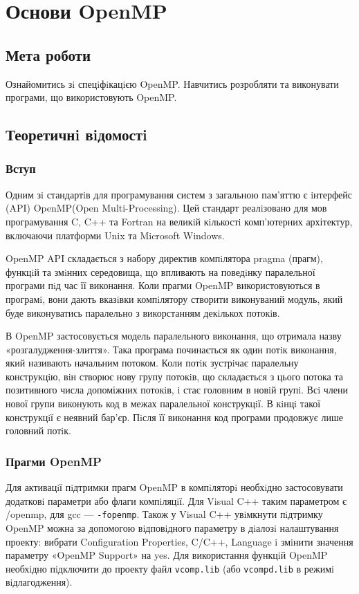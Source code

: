 \chapter{Основи OpenMP}
\nopagebreak[4]
\section*{Мета роботи}
Ознайомитись зi спецiфiкацiєю OpenMP. Навчитись розробляти та виконувати програми, що використовують OpenMP.

\nopagebreak[4]
\section{Теоретичнi вiдомостi}
\subsection*{Вступ}
\nopagebreak[4]

Одним зi стандартiв для програмування систем з загальною пам’яттю є iнтерфейс (API) OpenMP(Open Multi-Processing). Цей стандарт реалiзовано для мов програмування C, C++ та Fortran на великiй кiлькостi комп’ютерних архітектур, включаючи платформи Unix та Microsoft Windows.

OpenMP API складається з набору директив компiлятора pragma (прагм), функцiй та змiнних середовища, що впливають на поведiнку паралельної програми пiд час її виконання. Коли прагми OpenMP використовуються в програмi, вони дають вказiвки компiлятору створити виконуваний модуль, який буде виконуватись паралельно з викорстанням декiлькох потокiв.

В OpenMP застосовується модель паралельного виконання, що отримала назву «розгалудження-злиття». Така програма починається як один потiк виконання, який називають начальним потоком. Коли потiк зустрiчає паралельну конструкцiю, вiн створює нову групу потокiв, що складається з цього потока та позитивного числа допоміжних потокiв, i стає головним в новiй групi. Всi члени нової групи виконують код в межах паралельної конструкцiї. В кiнцi такої конструкцiї є неявний бар’єр. Пiсля її виконання код програми продовжує лише головний потiк.

\subsection*{Прагми OpenMP}
\nopagebreak[4]

Для активацiї пiдтримки прагм OpenMP в компiляторi необхiдно застосовувати додатковi параметри або флаги компiляцiї. Для Visual C++ таким параметром є /openmp, для gcc — \verb'-fopenmp'. Також у Visual C++ увiмкнути пiдтримку OpenMP можна за допомогою вiдповiдного параметру в дiалозi налаштування проекту: вибрати Configuration Properties, C/C++, Language i змiнити значення параметру «OpenMP Support» на yes. Для використання функцiй OpenMP необхiдно пiдключити до проекту файл \verb'vcomp.lib' (або \verb'vcompd.lib' в режимi вiдлагодження).

